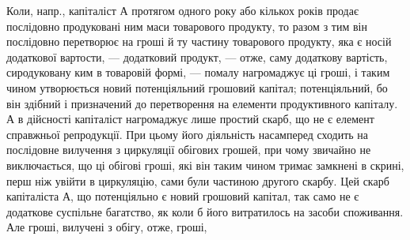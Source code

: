 Коли, напр., капіталіст $А$ протягом одного року або кількох років продає послідовно продуковані ним
маси товарового продукту, то разом з тим він послідовно перетворює на гроші й ту частину товарового
продукту, яка є носій додаткової вартости, — додатковий продукт, — отже, саму додаткову вартість,
сиродуковану ким в товаровій формі, — помалу нагромаджує ці гроші, і таким чином утворюється новий
потенціяльний грошовий капітал; потенціяльний, бо він здібний і призначений до перетворення на
елементи продуктивного капіталу. А в дійсності капіталіст нагромаджує лише простий скарб, що не є
елемент справжньої репродукції. При цьому його діяльність насамперед сходить на послідовне вилучення
з циркуляції обігових грошей, при чому звичайно не виключається, що ці обігові гроші, які він таким
чином тримає замкнені в скрині, перш ніж увійти в циркуляцію, сами були частиною другого скарбу. Цей
скарб капіталіста $А$, що потенціяльно є новий грошовий капітал, так само не є додаткове суспільне
багатство, як коли б його витратилось на засоби споживання. Але гроші, вилучені з обігу, отже,
гроші,
\parbreak{}  %

